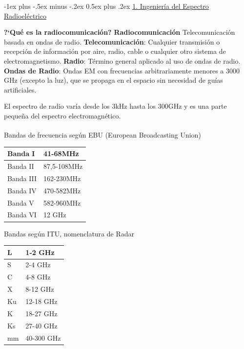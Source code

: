 \documentclass[10pt,portrait, twocolumn]{article}
\makeatletter
\renewcommand{\section}{\@startsection{section}{1}{0mm}%
                                {-1ex plus -.5ex minus -.2ex}%
                                {0.5ex plus .2ex}%
                                {\normalfont\large\bfseries}}
\makeatother
\begin{document}

\section{\underline{1. Ingeniería del Espectro Radioeléctrico}}

\textbf{?`Qué es la radiocomunicación?} \textbf{Radiocomunicación} Telecomunicación basada en ondas de radio. \textbf{Telecomunicación}: Cualquier transmisión o recepción de información por aire, radio, cable o cualquier otro sistema de electromagnetismo. \textbf{Radio}: Término general aplicado al uso de ondas de radio. \textbf{Ondas de Radio}: Ondas EM con frecuencias arbitrariamente menores a 3000 GHz (excepto la luz), que se propaga en el espacio sin necesidad de guías artificiales.

El espectro de radio varía desde los 3kHz hasta los 300GHz y es una parte pequeña del espectro electromagnético.\\

\\

Bandas de frecuencia según EBU (European Broadcasting Union)

	\begin{center}
\begin{tabular}{|l|l|}
\hline
Banda I   & 41-68MHz    \\ \hline
Banda II  & 87,5-108MHz \\ \hline
Banda III & 162-230MHz  \\ \hline
Banda IV  & 470-582MHz  \\ \hline
Banda V   & 582-960MHz  \\ \hline
Banda VI  & 12 GHz      \\ \hline
\end{tabular}
	\end{center}
	
Bandas según ITU, nomenclatura de Radar

	\begin{center}
	\begin{tabular}{|l|l|}
\hline
L  & 1-2 GHz    \\ \hline
S  & 2-4 GHz    \\ \hline
C  & 4-8 GHz    \\ \hline
X  & 8-12 GHz   \\ \hline
Ku & 12-18 GHz  \\ \hline
K  & 18-27 GHz  \\ \hline
Ks & 27-40 GHz  \\ \hline
mm & 40-300 GHz \\ \hline
\end{tabular}
	\end{center}
	
\end{document}
